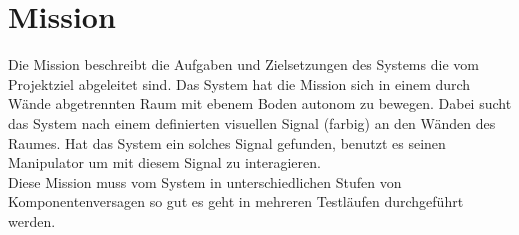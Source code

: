 \section{Mission}
\label{Mission}
Die Mission beschreibt die Aufgaben und Zielsetzungen des Systems die vom Projektziel abgeleitet sind.
Das System hat die Mission sich in einem durch Wände abgetrennten Raum mit ebenem Boden autonom zu bewegen. Dabei sucht das System nach einem definierten visuellen Signal (farbig) an den Wänden des Raumes. Hat das System ein solches Signal gefunden, benutzt es seinen Manipulator um mit diesem Signal zu interagieren.\\
Diese Mission muss vom System in unterschiedlichen Stufen von Komponentenversagen so gut es geht in mehreren Testläufen durchgeführt werden.\\